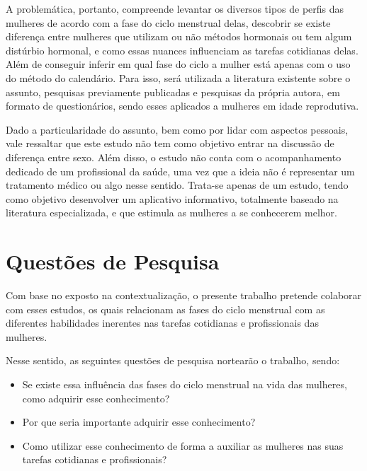 A problemática, portanto, compreende levantar os diversos tipos de perfis das mulheres de acordo com a 
fase do ciclo menstrual delas, descobrir se existe diferença entre mulheres que utilizam ou não métodos 
hormonais ou tem algum distúrbio hormonal, e como essas nuances influenciam as tarefas cotidianas delas. 
Além de conseguir inferir em qual fase do ciclo a mulher está apenas com o uso do método do calendário. 
Para isso, será utilizada a literatura existente sobre o assunto, pesquisas previamente publicadas e 
pesquisas da própria autora, em formato de questionários, sendo esses aplicados a mulheres em idade 
reprodutiva.


Dado a particularidade do assunto, bem como por lidar com aspectos pessoais, vale ressaltar que este 
estudo não tem como objetivo entrar na discussão de diferença entre sexo. Além disso, o estudo não 
conta com o acompanhamento dedicado de um profissional da saúde, uma vez que a ideia não é representar 
um tratamento médico ou algo nesse sentido. Trata-se apenas de um estudo, tendo como objetivo desenvolver 
um aplicativo informativo, totalmente baseado na literatura especializada, e que estimula as mulheres a 
se conhecerem melhor. 


\section{Questões de Pesquisa}

Com base no exposto na contextualização, o presente trabalho pretende colaborar com esses estudos, 
os quais relacionam as fases do ciclo menstrual com as diferentes habilidades inerentes nas tarefas 
cotidianas e profissionais das mulheres.

Nesse sentido, as seguintes questões de pesquisa nortearão o trabalho, sendo:

\begin{itemize}

        \item Se existe essa influência das fases do ciclo menstrual na vida das mulheres, como adquirir esse conhecimento?

        \item Por que seria importante adquirir esse conhecimento? 

        \item Como utilizar esse conhecimento de forma a auxiliar as mulheres nas suas tarefas cotidianas e profissionais?

\end{itemize}

